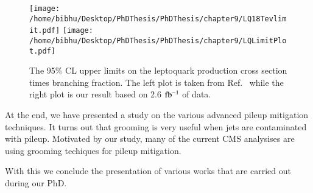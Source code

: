 \begin{figure}[h]
\centering
\texttt{[image: /home/bibhu/Desktop/PhDThesis/PhDThesis/chapter9/LQ18Tevlimit.pdf]}
\texttt{[image: /home/bibhu/Desktop/PhDThesis/PhDThesis/chapter9/LQLimitPlot.pdf]}
\caption{\label{fig:LQLimit8TeV13TeV}The 95\% CL upper limits on the leptoquark production cross section times branching fraction. The left plot is taken from Ref.~\cite{CMS-PAS-EXO-12-041} while the right plot is our result based on 2.6 $\rm fb^{-1}$ of data.}
\end{figure}


At the end, we have presented a study on the various advanced pileup mitigation techniques. It turns out that grooming is very useful when jets are contaminated with pileup. Motivated by our study, many of the current CMS analysises are using grooming techiques for pileup mitigation.

With this we conclude the presentation of various works that are carried out during our PhD.
































